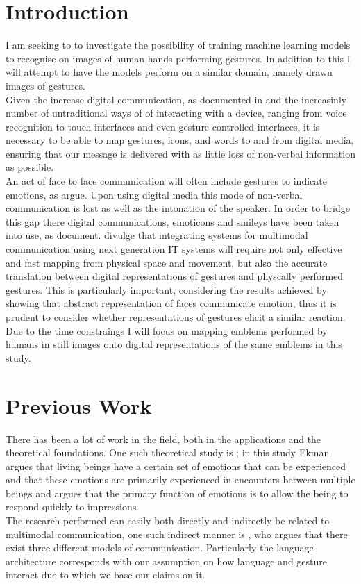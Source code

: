 \documentclass[11pt, a4paper]{article}
\begin{document}
\section{Introduction}
I am seeking to to investigate the possibility of training machine learning models to recognise on images of human hands performing gestures. In addition to this I will attempt to have the models perform on a similar domain, namely drawn images of gestures.\\
Given the increase digital communication, as documented in  and the increasinly number of untraditional ways of of interacting with a device, ranging from voice recognition to touch interfaces and even gesture controlled interfaces, it is necessary to be able to map gestures, icons, and words to and from digital media, ensuring that our message is delivered with as little loss of non-verbal information as possible.\\
An act of face to face communication will often include gestures to indicate emotions, as  argue. Upon using digital media this mode of non-verbal communication is lost as well as the intonation of the speaker. In order to bridge this gap there digital communications, emoticons and smileys have been taken into use, as  document.  divulge that integrating systems for multimodal communication using next generation IT systems will require not only effective and fast mapping from physical space and movement, but also the accurate translation between digital representations of gestures and physcally performed gestures. This is particularly important, considering the results achieved by  showing that abstract representation of faces communicate emotion, thus it is prudent to consider whether representations of gestures elicit a similar reaction.\\
Due to the time constraings I will focus on mapping emblems performed by humans in still images onto digital representations of the same emblems in this study.\\
\section{Previous Work}
There has been a lot of work in the field, both in the applications and the theoretical foundations. One such theoretical study is ; in this study Ekman argues that living beings have a certain set of emotions that can be experienced and that these emotions are primarily experienced in encounters between multiple beings and argues that the primary function of emotions is to allow the being to respond quickly to impressions.\\
The research  performed can easily both directly and indirectly be related to multimodal communication, one such indirect manner is , who argues that there exist three different models of communication. Particularly the language architecture corresponds with our assumption on how language and gesture interact due to which we base our claims on it.\\
\end{document}
